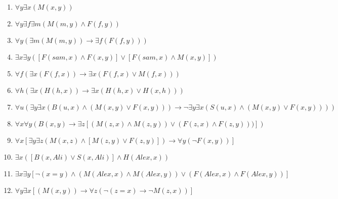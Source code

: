 \documentclass[a4paper,12pt]{article}
\begin{document}
\begin{tcolorbox}

\begin{enumerate}[label=\textbf{\arabic*})]
\item $\forall y \exists x (M(x,y))$
\item $\forall y \exists f \exists m (M(m,y) \wedge F(f,y))$
\item $\forall y (\exists m (M(m,y)) \rightarrow \exists f(F(f,y)))$
\item $\exists x \exists y ([F(sam,x) \wedge F(x,y)] \vee [F(sam,x) \wedge M(x,y)])$
\item $\forall f (\exists x (F(f,x)) \rightarrow \exists x (F(f,x) \vee M(f,x)))$
\item $\forall h (\exists x (H(h,x)) \rightarrow \exists x (H(h,x) \vee H(x,h)))$
\item $\forall u (\exists y \exists x(B(u,x) \wedge (M(x,y) \vee F(x,y))) \rightarrow \neg \exists y \exists x (S(u,x) \wedge (M(x,y) \vee F(x,y))))$
\item $\forall x \forall y (B(x,y) \rightarrow \exists z[(M(z,x) \wedge M(z,y)) \vee (F(z,x) \wedge F(z,y)))])$
\item $\forall x [\exists y \exists z(M(x,z) \wedge [M(z,y) \vee F(z,y)]) \rightarrow \forall y (\neg F(x,y))]$
\item $\exists x([B(x,Ali) \vee S(x,Ali)] \wedge H(Alex,x))$
\item $\exists x \exists y [\neg (x = y) \wedge (M(Alex,x) \wedge M(Alex,y)) \vee (F(Alex,x) \wedge F(Alex,y))]$
\item $\forall y \exists x [(M(x,y)) \rightarrow \forall z (\neg (z = x) \rightarrow \neg M(z,x))]$
\end{enumerate}

\end{tcolorbox}


\newpage
\end{document}
